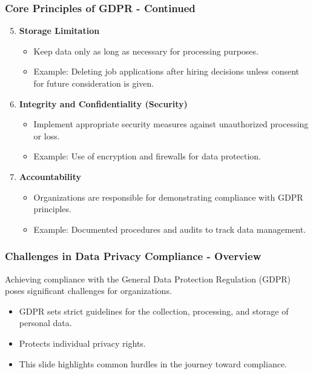 \documentclass[aspectratio=169]{beamer}
\begin{document}
\begin{frame}[fragile]
    \frametitle{Core Principles of GDPR - Continued}
    \begin{enumerate}
        \setcounter{enumi}{4}
        \item \textbf{Storage Limitation}
            \begin{itemize}
                \item Keep data only as long as necessary for processing purposes.
                \item Example: Deleting job applications after hiring decisions unless consent for future consideration is given.
            \end{itemize}

        \item \textbf{Integrity and Confidentiality (Security)}
            \begin{itemize}
                \item Implement appropriate security measures against unauthorized processing or loss.
                \item Example: Use of encryption and firewalls for data protection.
            \end{itemize}

        \item \textbf{Accountability}
            \begin{itemize}
                \item Organizations are responsible for demonstrating compliance with GDPR principles.
                \item Example: Documented procedures and audits to track data management.
            \end{itemize}
    \end{enumerate}
\end{frame}

\begin{frame}[fragile]
    \frametitle{Challenges in Data Privacy Compliance - Overview}
    Achieving compliance with the General Data Protection Regulation (GDPR) poses significant challenges for organizations. 
    \begin{itemize}
        \item GDPR sets strict guidelines for the collection, processing, and storage of personal data.
        \item Protects individual privacy rights.
        \item This slide highlights common hurdles in the journey toward compliance.
    \end{itemize}
\end{frame}
\end{document}
